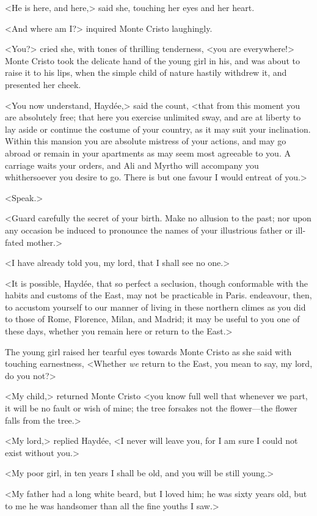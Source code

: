  <He is here, and here,> said she, touching her eyes and her heart. 

 <And where am I?> inquired Monte Cristo laughingly. 

 <You?> cried she, with tones of thrilling tenderness, <you are everywhere!> Monte Cristo took the delicate hand of the young girl in his, and was about to raise it to his lips, when the simple child of nature hastily withdrew it, and presented her cheek. 

 <You now understand, Haydée,> said the count, <that from this moment you are absolutely free; that here you exercise unlimited sway, and are at liberty to lay aside or continue the costume of your country, as it may suit your inclination. Within this mansion you are absolute mistress of your actions, and may go abroad or remain in your apartments as may seem most agreeable to you. A carriage waits your orders, and Ali and Myrtho will accompany you whithersoever you desire to go. There is but one favour I would entreat of you.> 

 <Speak.> 

 <Guard carefully the secret of your birth. Make no allusion to the past; nor upon any occasion be induced to pronounce the names of your illustrious father or ill-fated mother.> 

 <I have already told you, my lord, that I shall see no one.> 

 <It is possible, Haydée, that so perfect a seclusion, though conformable with the habits and customs of the East, may not be practicable in Paris. endeavour, then, to accustom yourself to our manner of living in these northern climes as you did to those of Rome, Florence, Milan, and Madrid; it may be useful to you one of these days, whether you remain here or return to the East.> 

 The young girl raised her tearful eyes towards Monte Cristo as she said with touching earnestness, <Whether \textit{we} return to the East, you mean to say, my lord, do you not?> 

 <My child,> returned Monte Cristo <you know full well that whenever we part, it will be no fault or wish of mine; the tree forsakes not the flower—the flower falls from the tree.> 

 <My lord,> replied Haydée, <I never will leave you, for I am sure I could not exist without you.> 

 <My poor girl, in ten years I shall be old, and you will be still young.> 

 <My father had a long white beard, but I loved him; he was sixty years old, but to me he was handsomer than all the fine youths I saw.> 

